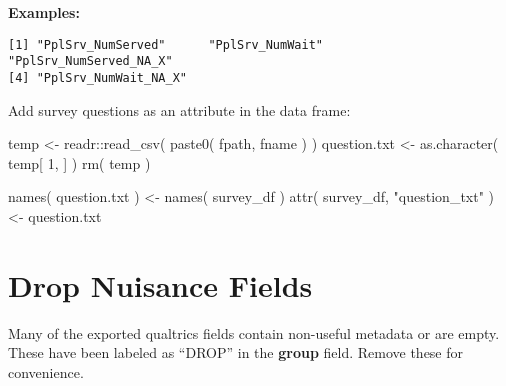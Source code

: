 \documentclass[
  letterpaper,
]{scrbook}
\newenvironment{Shaded}{\begin{snugshade}}{\end{snugshade}}
\newcommand{\CommentTok}[1]{\textcolor[rgb]{0.37,0.37,0.37}{#1}}
\newcommand{\DecValTok}[1]{\textcolor[rgb]{0.68,0.00,0.00}{#1}}
\newcommand{\FunctionTok}[1]{\textcolor[rgb]{0.28,0.35,0.67}{#1}}
\newcommand{\NormalTok}[1]{\textcolor[rgb]{0.00,0.23,0.31}{#1}}
\newcommand{\OtherTok}[1]{\textcolor[rgb]{0.00,0.23,0.31}{#1}}
\newcommand{\SpecialCharTok}[1]{\textcolor[rgb]{0.37,0.37,0.37}{#1}}
\newcommand{\StringTok}[1]{\textcolor[rgb]{0.13,0.47,0.30}{#1}}
\begin{document}
\textbf{Examples:}

\begin{verbatim}
[1] "PplSrv_NumServed"      "PplSrv_NumWait"        "PplSrv_NumServed_NA_X"
[4] "PplSrv_NumWait_NA_X"  
\end{verbatim}

Add survey questions as an attribute in the data frame:

\begin{Shaded}
\begin{Highlighting}[]
\NormalTok{temp          }\OtherTok{\textless{}{-}}\NormalTok{ readr}\SpecialCharTok{::}\FunctionTok{read\_csv}\NormalTok{( }\FunctionTok{paste0}\NormalTok{( fpath, fname ) )}
\NormalTok{question.txt  }\OtherTok{\textless{}{-}} \FunctionTok{as.character}\NormalTok{( temp[ }\DecValTok{1}\NormalTok{, ] )}
\FunctionTok{rm}\NormalTok{( temp )}

\FunctionTok{names}\NormalTok{( question.txt ) }\OtherTok{\textless{}{-}} \FunctionTok{names}\NormalTok{( survey\_df )}
\FunctionTok{attr}\NormalTok{( survey\_df, }\StringTok{"question\_txt"}\NormalTok{ ) }\OtherTok{\textless{}{-}}\NormalTok{ question.txt}
\end{Highlighting}
\end{Shaded}

\section*{Drop Nuisance Fields}\label{drop-nuisance-fields-1}


Many of the exported qualtrics fields contain non-useful metadata or are
empty. These have been labeled as ``DROP'' in the \textbf{group} field.
Remove these for convenience.

\begin{Shaded}
\end{Shaded}
\end{document}
